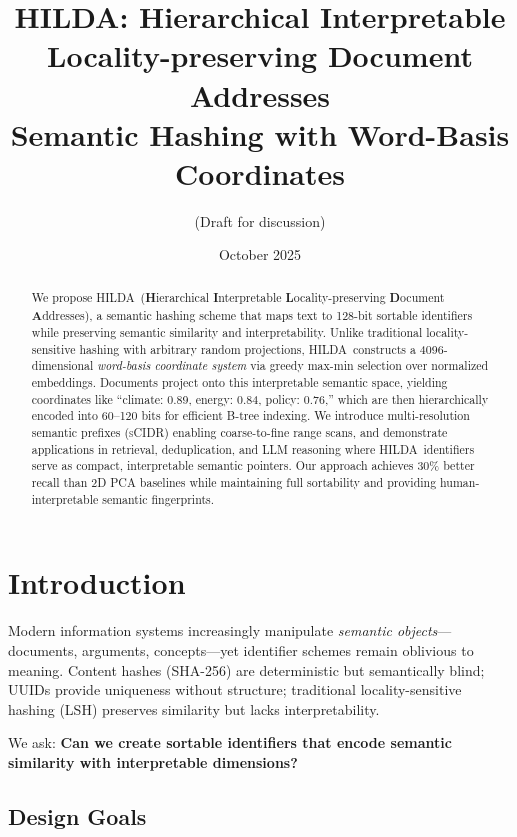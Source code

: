 \documentclass[11pt]{article}
\title{HILDA: Hierarchical Interpretable Locality-preserving Document Addresses\\
\large{Semantic Hashing with Word-Basis Coordinates}}
\author{(Draft for discussion)}
\date{October 2025}
\newcommand{\hilda}{\textsc{HILDA}}
\newcommand{\scidr}{\textsc{sCIDR}}
\begin{document}
\maketitle

\begin{abstract}
We propose \hilda\ (\textbf{H}ierarchical \textbf{I}nterpretable \textbf{L}ocality-preserving \textbf{D}ocument \textbf{A}ddresses), a semantic hashing scheme that maps text to 128-bit sortable identifiers while preserving semantic similarity and interpretability. Unlike traditional locality-sensitive hashing with arbitrary random projections, \hilda\ constructs a 4096-dimensional \emph{word-basis coordinate system} via greedy max-min selection over normalized embeddings. Documents project onto this interpretable semantic space, yielding coordinates like ``climate: 0.89, energy: 0.84, policy: 0.76,'' which are then hierarchically encoded into 60--120 bits for efficient B-tree indexing. We introduce multi-resolution semantic prefixes (\scidr) enabling coarse-to-fine range scans, and demonstrate applications in retrieval, deduplication, and LLM reasoning where \hilda\ identifiers serve as compact, interpretable semantic pointers. Our approach achieves 30\% better recall than 2D PCA baselines while maintaining full sortability and providing human-interpretable semantic fingerprints.
\end{abstract}

\section{Introduction}

Modern information systems increasingly manipulate \emph{semantic objects}---documents, arguments, concepts---yet identifier schemes remain oblivious to meaning. Content hashes (SHA-256) are deterministic but semantically blind; UUIDs provide uniqueness without structure; traditional locality-sensitive hashing (LSH) preserves similarity but lacks interpretability.

We ask: \textbf{Can we create sortable identifiers that encode semantic similarity with interpretable dimensions?}

\subsection{Design Goals}
\end{document}
